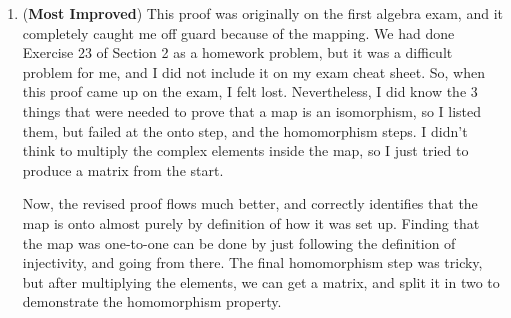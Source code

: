 \begin{enumerate}[label=\textbf{\arabic*.}]
    \begin{problem}
        Show that each homomorphism from a field to a ring is either one to one or maps everything to 0.
    \end{problem}


    \newpage

    \item (\textbf{Most Improved}) This proof was originally on the first algebra exam, and it completely caught me off guard because of the mapping. We had done Exercise 23 of Section 2 as a homework problem, but it was a difficult problem for me, and I did not include it on my exam cheat sheet. So, when this proof came up on the exam, I felt lost. Nevertheless, I did know the 3 things that were needed to prove that a map is an isomorphism, so I listed them, but failed at the onto step, and the homomorphism steps. I didn't think to multiply the complex elements inside the map, so I just tried to produce a matrix from the start. 
    
    Now, the revised proof flows much better, and correctly identifies that the map is onto almost purely by definition of how it was set up. Finding that the map was one-to-one can be done by just following the definition of injectivity, and going from there. The final homomorphism step was tricky, but after multiplying the elements, we can get a matrix, and split it in two to demonstrate the homomorphism property. 


\end{enumerate}

